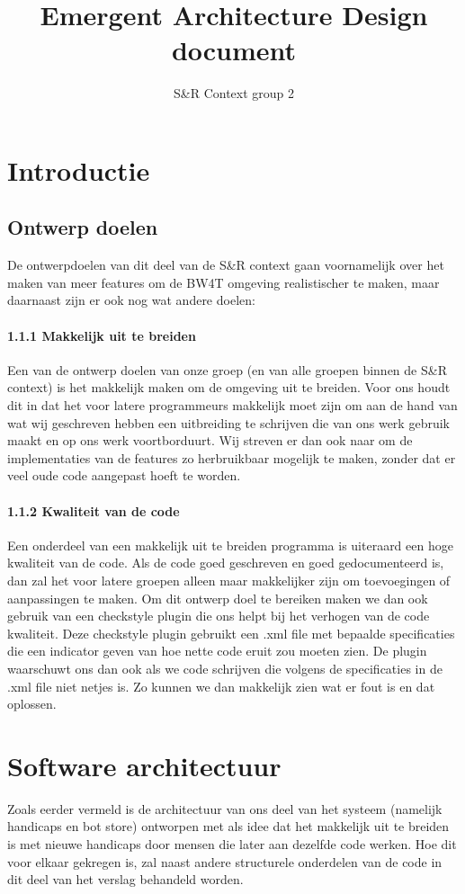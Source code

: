 \documentclass[]{article}
\title{Emergent Architecture Design document}
\author{S\&R Context group 2}
\begin{document}
\maketitle

\section{Introductie}
\subsection{Ontwerp doelen}
De ontwerpdoelen van dit deel van de S\&R context gaan voornamelijk over het maken van meer features om de BW4T omgeving realistischer te maken, maar daarnaast zijn er ook nog wat andere doelen:
\paragraph{1.1.1 Makkelijk uit te breiden} Een van de ontwerp doelen van onze groep (en van alle groepen binnen de S\&R context) is het makkelijk maken om de omgeving uit te breiden. Voor ons houdt dit in dat het voor latere programmeurs makkelijk moet zijn om aan de hand van wat wij geschreven hebben een uitbreiding te schrijven die van ons werk gebruik maakt en op ons werk voortborduurt. Wij streven er dan ook naar om de implementaties van de features zo herbruikbaar mogelijk te maken, zonder dat er veel oude code aangepast hoeft te worden.
\paragraph{1.1.2 Kwaliteit van de code} Een onderdeel van een makkelijk uit te breiden programma is uiteraard een hoge kwaliteit van de code. Als de code goed geschreven en goed gedocumenteerd is, dan zal het voor latere groepen alleen maar makkelijker zijn om toevoegingen of aanpassingen te maken. Om dit ontwerp doel te bereiken maken we dan ook gebruik van een checkstyle plugin die ons helpt bij het verhogen van de code kwaliteit. Deze checkstyle plugin gebruikt een .xml file met bepaalde specificaties die een indicator geven van hoe nette code eruit zou moeten zien. De plugin waarschuwt ons dan ook als we code schrijven die volgens de specificaties in de .xml file niet netjes is. Zo kunnen we dan makkelijk zien wat er fout is en dat oplossen.
\section{Software architectuur}
Zoals eerder vermeld is de architectuur van ons deel van het systeem (namelijk handicaps en bot store) ontworpen met als idee dat het makkelijk uit te breiden is met nieuwe handicaps door mensen die later aan dezelfde code werken. Hoe dit voor elkaar gekregen is, zal naast andere structurele onderdelen van de code in dit deel van het verslag behandeld worden.
\end{document}
